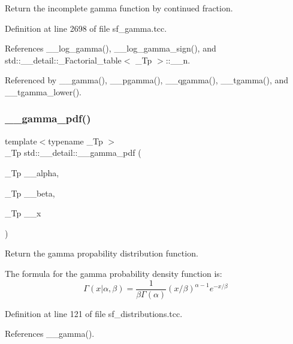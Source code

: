 Return the incomplete gamma function by continued fraction. 



Definition at line 2698 of file sf\+\_\+gamma.\+tcc.



References \+\_\+\+\_\+log\+\_\+gamma(), \+\_\+\+\_\+log\+\_\+gamma\+\_\+sign(), and std\+::\+\_\+\+\_\+detail\+::\+\_\+\+Factorial\+\_\+table$<$ \+\_\+\+Tp $>$\+::\+\_\+\+\_\+n.



Referenced by \+\_\+\+\_\+gamma(), \+\_\+\+\_\+pgamma(), \+\_\+\+\_\+qgamma(), \+\_\+\+\_\+tgamma(), and \+\_\+\+\_\+tgamma\+\_\+lower().

\mbox{\label{namespacestd_1_1____detail_a13146321e4e094815de990c33b83b02a}} 
\subsubsection{\texorpdfstring{\+\_\+\+\_\+gamma\+\_\+pdf()}{\_\_gamma\_pdf()}}
{\footnotesize\ttfamily template$<$typename \+\_\+\+Tp $>$ \\
\+\_\+\+Tp std\+::\+\_\+\+\_\+detail\+::\+\_\+\+\_\+gamma\+\_\+pdf (\begin{DoxyParamCaption}\item[{\+\_\+\+Tp}]{\+\_\+\+\_\+alpha,  }\item[{\+\_\+\+Tp}]{\+\_\+\+\_\+beta,  }\item[{\+\_\+\+Tp}]{\+\_\+\+\_\+x }\end{DoxyParamCaption})}



Return the gamma propability distribution function. 

The formula for the gamma probability density function is\+: \[ \Gamma(x|\alpha,\beta) = \frac{1}{\beta\Gamma(\alpha)} (x/\beta)^{\alpha - 1} e^{-x/\beta} \] 

Definition at line 121 of file sf\+\_\+distributions.\+tcc.



References \+\_\+\+\_\+gamma().

\mbox{\label{namespacestd_1_1____detail_a8ac187fda39e0c55614e4c58146f871c}} 

